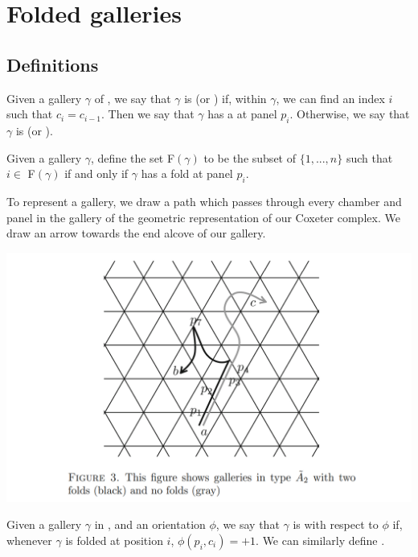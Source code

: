 \documentclass[11pt]{article}
\begin{document}
\section{Folded galleries}

\subsection{Definitions}


\begin{definition}
    Given a gallery $\gamma$ of \sg, we say that $\gamma$ is  (or ) if, within $\gamma$, we can find an index $i$ such that $c_i=c_{i-1}$. Then we say that $\gamma$ has a  at panel $p_i$. Otherwise, we say that $\gamma$ is  (or ).  
\end{definition}

\begin{definition}
    Given a gallery $\gamma$, define the set F$(\gamma)$ to be the subset of $\{1,...,n\}$ such that $i\in$ F$(\gamma)$ if and only if $\gamma$ has a fold at panel $p_i$. 
\end{definition}

To represent a gallery, we draw a path which passes through every chamber and panel in the gallery of the geometric representation of our Coxeter complex. We draw an arrow towards the end alcove of our gallery. 

\includegraphics[scale=0.6]{Screenshot 2023-02-03 111653.png}\\

\begin{definition}
    Given a gallery $\gamma$ in \sg, and an orientation $\phi$, we say that $\gamma$ is  with respect to $\phi$ if, whenever $\gamma$ is folded at position $i$, $\phi(p_i,c_i)=+1$.  We can similarly define .
\end{definition}
\end{document}
